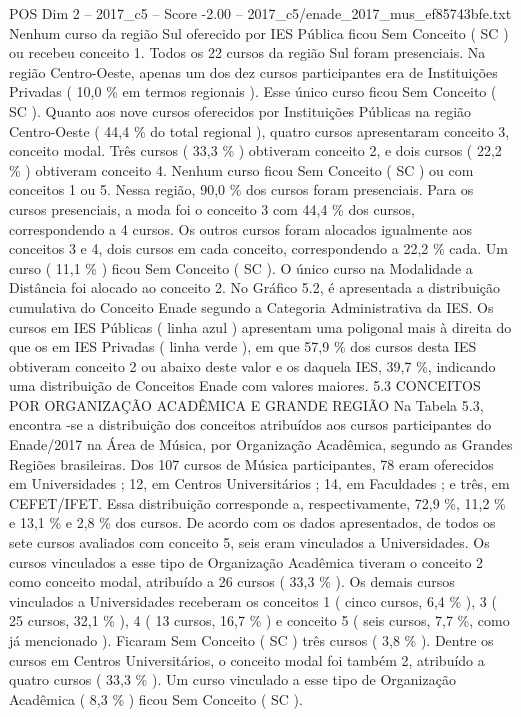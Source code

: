 \begin{textsample}{POS Dim 2 – 2017\_c5 – Score -2.00 – 2017\_c5/enade\_2017\_mus\_ef85743bfe.txt}
Nenhum curso da região Sul oferecido por IES Pública ficou Sem Conceito ( SC ) ou recebeu conceito 1.
Todos os 22 cursos da região Sul foram presenciais.
Na região Centro-Oeste, apenas um dos dez cursos participantes era de Instituições Privadas ( 10,0 \% em termos regionais ).
Esse único curso ficou Sem Conceito ( SC ).
Quanto aos nove cursos oferecidos por Instituições Públicas na região Centro-Oeste ( 44,4 \% do total regional ), quatro cursos apresentaram conceito 3, conceito modal.
Três cursos ( 33,3 \% ) obtiveram conceito 2, e dois cursos ( 22,2 \% ) obtiveram conceito 4.
Nenhum curso ficou Sem Conceito ( SC ) ou com conceitos 1 ou 5.
Nessa região, 90,0 \% dos cursos foram presenciais.
Para os cursos presenciais, a moda foi o conceito 3 com 44,4 \% dos cursos, correspondendo a 4 cursos.
Os outros cursos foram alocados igualmente aos conceitos 3 e 4, dois cursos em cada conceito, correspondendo a 22,2 \% cada.
Um curso ( 11,1 \% ) ficou Sem Conceito ( SC ).
O único curso na Modalidade a Distância foi alocado ao conceito 2.
No Gráfico 5.2, é apresentada a distribuição cumulativa do Conceito Enade segundo a Categoria Administrativa da IES.
Os cursos em IES Públicas ( linha azul ) apresentam uma poligonal mais à direita do que os em IES Privadas ( linha verde ), em que 57,9 \% dos cursos desta IES obtiveram conceito 2 ou abaixo deste valor e os daquela IES, 39,7 \%, indicando uma distribuição de Conceitos Enade com valores maiores. 5.3 CONCEITOS POR ORGANIZAÇÃO ACADÊMICA E GRANDE REGIÃO Na Tabela 5.3, encontra -se a distribuição dos conceitos atribuídos aos cursos participantes do Enade/2017 na Área de Música, por Organização Acadêmica, segundo as Grandes Regiões brasileiras.
Dos 107 cursos de Música participantes, 78 eram oferecidos em Universidades ; 12, em Centros Universitários ; 14, em Faculdades ; e três, em CEFET/IFET.
Essa distribuição corresponde a, respectivamente, 72,9 \%, 11,2 \% e 13,1 \% e 2,8 \% dos cursos.
De acordo com os dados apresentados, de todos os sete cursos avaliados com conceito 5, seis eram vinculados a Universidades.
Os cursos vinculados a esse tipo de Organização Acadêmica tiveram o conceito 2 como conceito modal, atribuído a 26 cursos ( 33,3 \% ).
Os demais cursos vinculados a Universidades receberam os conceitos 1 ( cinco cursos, 6,4 \% ), 3 ( 25 cursos, 32,1 \% ), 4 ( 13 cursos, 16,7 \% ) e conceito 5 ( seis cursos, 7,7 \%, como já mencionado ).
Ficaram Sem Conceito ( SC ) três cursos ( 3,8 \% ).
Dentre os cursos em Centros Universitários, o conceito modal foi também 2, atribuído a quatro cursos ( 33,3 \% ).
Um curso vinculado a esse tipo de Organização Acadêmica ( 8,3 \% ) ficou Sem Conceito ( SC ).

\end{textsample}
